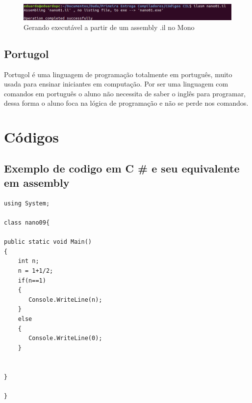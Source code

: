 \documentclass[hidelinks,12pt]{article}
\begin{document}
	\begin{figure}[h!]
	\centering
	\includegraphics[scale=0.5]{Figures/ilasmmono}
	\caption{Gerando executável a partir de um assembly .il no Mono}
	\end{figure}	
	
	\newpage
	\subsection{Portugol}
	
	Portugol é uma linguagem de programação totalmente em português, muito usada para ensinar iniciantes em computação. Por ser uma linguagem com comandos em português o aluno não necessita de saber o inglês para programar, dessa forma o aluno foca na lógica de programação e não se perde nos comandos. 
	
\section{Códigos}	

\subsection{Exemplo de codigo em C \# e seu equivalente em assembly}

\begin{lstlisting}[caption=Atribuição de duas operações aritméticas sobre inteiros a uma variável(C\#)]
using System;

class nano09{

public static void Main()
{
	int n;
	n = 1+1/2;
	if(n==1)
	{
	   Console.WriteLine(n);
	}
	else
	{
	   Console.WriteLine(0);
	}

	
}

}

\end{lstlisting}
\end{document}
